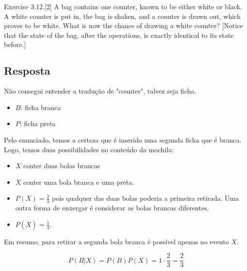 \item
  Exercise 3.12.[2] A bag contains one counter, known to be either white or
  black. A white counter is put in, the bag is shaken, and a counter
  is drawn out, which proves to be white. What is now the chance of
  drawing a white counter? [Notice that the state of the bag, after the
  operations, is exactly identical to its state before.]

\subsection*{Resposta}

Não consegui entender a tradução de "counter", talvez seja ficha.

\begin{itemize}
  \item $B$: ficha branca
  \item $P$: ficha preta
\end{itemize}

Pelo enunciado, temos a certeza que é inserido uma segunda ficha que é branca.
Logo, temos duas possibilidades no conteúdo da mochila:

\begin{itemize}
  \item $X$ conter duas bolas brancas
  \item $\overline{X}$ conter uma bola branca e uma preta.
  \item $P(X) = \frac{2}{3}$ pois qualquer das duas bolas poderia a primeira retirada.
  Uma outra forma de enxergar é considerar as bolas brancas diferentes.
  \item $P(\overline{X}) = \frac{1}{3}$.
\end{itemize}

Em resumo, para retirar a segunda bola branca é possível apenas no evento $X$.

\[P(B|X) = P(B)P(X) = 1 \cdot \frac{2}{3} = \frac{2}{3}\]
